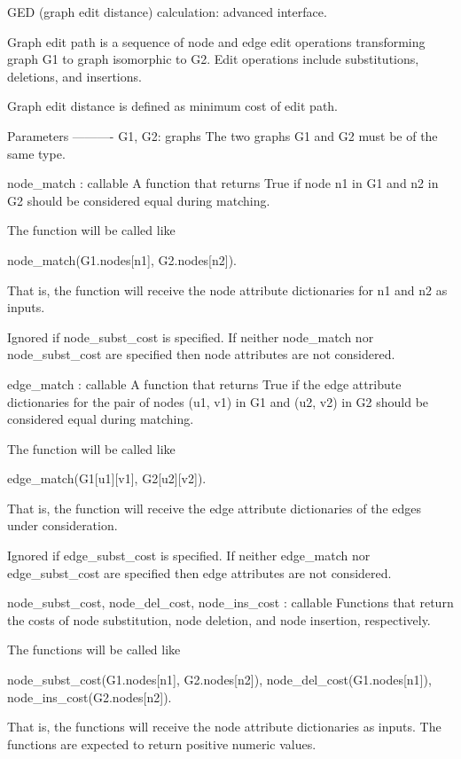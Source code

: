 \begin{DoxyVerb}GED (graph edit distance) calculation: advanced interface.

Graph edit path is a sequence of node and edge edit operations
transforming graph G1 to graph isomorphic to G2.  Edit operations
include substitutions, deletions, and insertions.

Graph edit distance is defined as minimum cost of edit path.

Parameters
----------
G1, G2: graphs
    The two graphs G1 and G2 must be of the same type.

node_match : callable
    A function that returns True if node n1 in G1 and n2 in G2
    should be considered equal during matching.

    The function will be called like

       node_match(G1.nodes[n1], G2.nodes[n2]).

    That is, the function will receive the node attribute
    dictionaries for n1 and n2 as inputs.

    Ignored if node_subst_cost is specified.  If neither
    node_match nor node_subst_cost are specified then node
    attributes are not considered.

edge_match : callable
    A function that returns True if the edge attribute dictionaries
    for the pair of nodes (u1, v1) in G1 and (u2, v2) in G2 should
    be considered equal during matching.

    The function will be called like

       edge_match(G1[u1][v1], G2[u2][v2]).

    That is, the function will receive the edge attribute
    dictionaries of the edges under consideration.

    Ignored if edge_subst_cost is specified.  If neither
    edge_match nor edge_subst_cost are specified then edge
    attributes are not considered.

node_subst_cost, node_del_cost, node_ins_cost : callable
    Functions that return the costs of node substitution, node
    deletion, and node insertion, respectively.

    The functions will be called like

       node_subst_cost(G1.nodes[n1], G2.nodes[n2]),
       node_del_cost(G1.nodes[n1]),
       node_ins_cost(G2.nodes[n2]).

    That is, the functions will receive the node attribute
    dictionaries as inputs.  The functions are expected to return
    positive numeric values.


\end{DoxyVerb}
